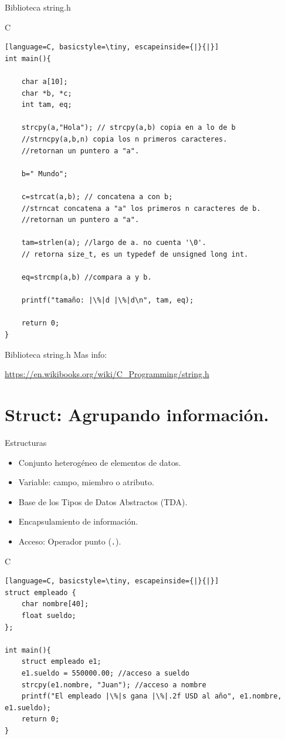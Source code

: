 \documentclass{beamer}
\begin{document}
\begin{frame}[fragile]{Biblioteca string.h}
\begin{exampleblock}{C}
\begin{lstlisting}[language=C, basicstyle=\tiny, escapeinside={|}{|}]
int main(){

	char a[10];
	char *b, *c;
	int tam, eq;

	strcpy(a,"Hola"); // strcpy(a,b) copia en a lo de b
	//strncpy(a,b,n) copia los n primeros caracteres.
	//retornan un puntero a "a". 

	b=" Mundo";
	
	c=strcat(a,b); // concatena a con b;
	//strncat concatena a "a" los primeros n caracteres de b.
	//retornan un puntero a "a". 
	
	tam=strlen(a); //largo de a. no cuenta '\0'.
	// retorna size_t, es un typedef de unsigned long int.

	eq=strcmp(a,b) //compara a y b.

	printf("tamaño: |\%|d |\%|d\n", tam, eq);

	return 0;
}

\end{lstlisting}
\end{exampleblock}
\end{frame}


\begin{frame}[fragile]{Biblioteca string.h}
Mas info:

{\centering\large \url{https://en.wikibooks.org/wiki/C_Programming/string.h}}

\end{frame}



\section{Struct: Agrupando información.}
\begin{frame}[fragile]{Estructuras}
\begin{itemize}
	\item Conjunto heterogéneo de elementos de datos.
	\item Variable: campo, miembro o atributo.
	\item Base de los Tipos de Datos Abstractos (TDA).
	\item Encapsulamiento de información.
	\item Acceso: Operador punto (\texttt{.}).
\end{itemize}
\begin{exampleblock}{C}
\begin{lstlisting}[language=C, basicstyle=\tiny, escapeinside={|}{|}]
struct empleado {
    char nombre[40];
    float sueldo;
};

int main(){
	struct empleado e1;
	e1.sueldo = 550000.00; //acceso a sueldo
	strcpy(e1.nombre, "Juan"); //acceso a nombre
	printf("El empleado |\%|s gana |\%|.2f USD al año", e1.nombre, e1.sueldo); 
	return 0;
}
\end{lstlisting}
\end{exampleblock}
\end{frame}
\end{document}
